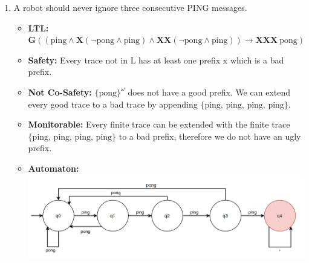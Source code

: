 \documentclass[12pt]{article}
\begin{document}
\begin{enumerate}
\item A robot should never ignore three consecutive PING messages.
	\begin{itemize}
		\item \textbf{LTL:} $\mathbf{G}((\text{ping} \land \mathbf{X}(\neg \text{pong} \land \text{ping}) \land \mathbf{X}\mathbf{X}(\neg \text{pong} \land \text{ping})) \rightarrow \mathbf{X}\mathbf{X}\mathbf{X} \: \text{pong})$
		\item \textbf{Safety:} Every trace not in L has at least one prefix x which is a bad prefix.
		\item \textbf{Not Co-Safety:} $\{ \text{pong}\}^ {\omega}$ does not have a good prefix. We can extend every good trace to a bad trace by appending $\{\text{ping, ping, ping, ping}\}$.
		\item \textbf{Monitorable:} Every finite trace can be extended with the finite trace $\{\text{ping, ping, ping, ping}\}$ to a bad prefix, therefore we do not have an ugly prefix.
		\item \textbf{Automaton:} \\
			\includegraphics[scale = 0.5]{images/pingAutomaton}
	\end{itemize}		
	

\end{enumerate}
\end{document}
